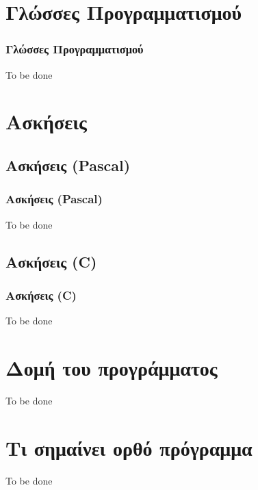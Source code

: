 \documentclass{beamer}
\begin{document}

\section{Γλώσσες Προγραμματισμού}
\begin{frame}
	\frametitle{Γλώσσες Προγραμματισμού}
  To be done
\end{frame}

\section{Ασκήσεις}

\subsection{Ασκήσεις (Pascal)}
\begin{frame}
	\frametitle{Ασκήσεις (Pascal)}
  To be done
\end{frame}

\subsection{Ασκήσεις (C)}
\begin{frame}
	\frametitle{Ασκήσεις (C)}
  To be done
\end{frame}

\section{Δομή του προγράμματος}
\begin{frame}
  To be done
\end{frame}

\section{Τι σημαίνει ορθό πρόγραμμα}
\begin{frame}
  To be done
\end{frame}
\end{document}
